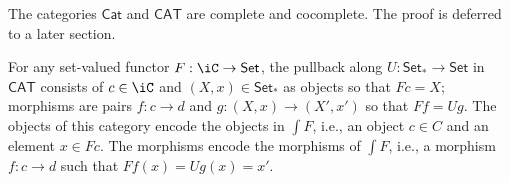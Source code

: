\documentclass{amsart}
\begin{document}
The categories $\mathsf{Cat}$ and $\mathsf{CAT}$ are complete and cocomplete.
The proof is deferred to a later section.

\begin{rmk}
  For any set-valued functor $F : \iC \to \mathsf{Set}$, the pullback along $U : \mathsf{Set}_{*} \to \mathsf{Set}$ in $\mathsf{CAT}$ consists of $c \in \iC$ and $(X, x) \in \mathsf{Set}_{*}$
  as objects so that $Fc = X$; morphisms are pairs $f : c \to d$ and $g : (X, x) \to (X', x')$ so that $Ff = Ug$.
  The objects of this category encode the objects in $\int F$, i.e., an object $c \in C$ and an element $x \in Fc$.
  The morphisms encode the morphisms of $\int F$, i.e., a morphism $f : c \to d$ such that $Ff(x) = Ug(x) = x'$.
  
\end{rmk}



\end{document}
